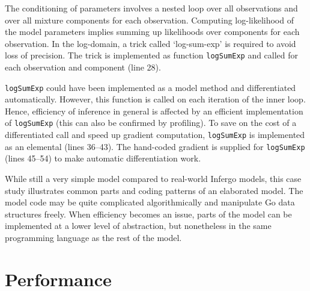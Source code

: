 \documentclass[sigplan,review,10pt,anonymous]{acmart}
\begin{document}
\begin{sloppypar}
The conditioning of parameters involves a nested loop over all
observations and over all mixture components for each
observation.  Computing log-likelihood of the model parameters
implies summing up likelihoods over components for each
observation.  In the log-domain, a trick called `log-sum-exp' is
required to avoid loss of precision. The trick is implemented
as function \lstinline{logSumExp} and called for each
observation and component (line 28).

\lstinline{logSumExp} could have been implemented as a model
method and differentiated automatically. However, this function
is called on each iteration of the inner loop. Hence,
efficiency of inference in general is affected by 
an efficient implementation of \lstinline{logSumExp} (this can
also be confirmed by profiling). To save on the cost of a
differentiated call and speed up gradient computation,
\lstinline{logSumExp} is implemented as an elemental (lines
36--43). The hand-coded gradient is supplied for
\lstinline{logSumExp} (lines 45--54) to make automatic
differentiation work.

While still a very simple model compared to real-world Infergo
models, this case study illustrates common parts and coding
patterns of an elaborated model. The model code may be quite
complicated algorithmically and manipulate Go data structures
freely. When efficiency becomes an issue, parts of the model
can be implemented at a lower level of abstraction, but
nonetheless in the same programming language as the rest of the
model.

\section{Performance}


\end{sloppypar}
\end{document}
